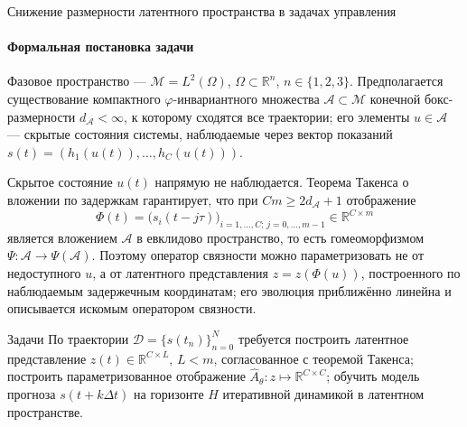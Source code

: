 \documentclass[10pt]{beamer}
\newcommand{\R}{\mathbb{R}}
\begin{document}
\begin{frame}{Снижение размерности латентного пространства в задачах управления}
\framesubtitle{Формальная постановка задачи}
\footnotesize

Фазовое пространство --- $\mathcal M = L^2(\Omega)$, $\Omega \subset
\R^n$, $n \in \{1,2,3\}$. Предполагается существование компактного
$\varphi$-инвариантного множества $\mathcal A \subset \mathcal M$ конечной
бокс-размерности $d_{\mathcal A} < \infty$, к которому сходятся все
траектории; его элементы $u \in \mathcal A$ --- скрытые состояния системы,
наблюдаемые через вектор показаний $s(t) = (h_1(u(t)), \dots, h_C(u(t)))$.

Скрытое состояние $u(t)$ напрямую не наблюдается. Теорема Такенса о
вложении по задержкам гарантирует, что при $Cm \ge 2 d_{\mathcal A}+1$
отображение
\[
\Phi(t) = \bigl(s_i(t-j\tau)\bigr)_{i=1,\dots,C;\,j=0,\dots,m-1} \in \R^{C \times m}
\]
является вложением $\mathcal A$ в евклидово пространство, то есть
гомеоморфизмом $\Psi: \mathcal A \to \Psi(\mathcal A)$. Поэтому оператор
связности можно параметризовать не от недоступного $u$, а от латентного
представления $z = z(\Phi(u))$, построенного по наблюдаемым задержечным
координатам; его эволюция приближённо линейна и описывается искомым
оператором связности.

\begin{block}{Задачи}
По траектории $\mathcal D = \{s(t_n)\}_{n=0}^{N}$ требуется построить
латентное представление $z(t) \in \R^{C \times L}$, $L<m$, согласованное с
теоремой Такенса; построить параметризованное отображение $\hat A_\theta: z
\mapsto \R^{C \times C}$; обучить модель прогноза $s(t+k\Delta t)$ на
горизонте $H$ итеративной динамикой в латентном пространстве.
\end{block}
\end{frame}
\end{document}

